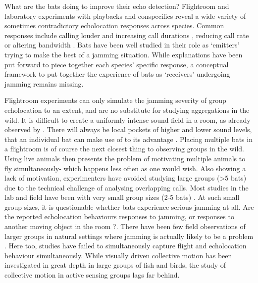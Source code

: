 \documentclass[
]{book}
\begin{document}
What are the bats doing to improve their echo detection? Flightroom and laboratory experiments with playbacks and conspecifics reveal a wide variety of sometimes contradictory echolocation responses across species. Common responses include calling louder and increasing call durations \citep{tressler2009a, m1989a, amichai2015a, luo2015a}, reducing call rate \citep{adams2017a} or altering bandwidth \citep{hase2016a, hase2018a, hage2013ambient}. Bats have been well studied in their role as `emitters' trying to make the best of a jamming situation. While explanations have been put forward to piece together each species' specific response, a conceptual framework to put together the experience of bats as `receivers' undergoing jamming remains missing.

Flightroom experiments can only simulate the jamming severity of group echolocation to an extent, and are no substitute for studying aggregations in the wild. It is difficult to create a uniformly intense sound field in a room, as already observed by \citet{griffinresistance}. There will always be local pockets of higher and lower sound levels, that an individual bat can make use of to its advantage . Placing multiple bats in a flightroom is of course the next closest thing to observing groups in the wild. Using live animals then presents the problem of motivating multiple animals to fly simultaneously- which happens less often as one would wish. Also showing a lack of motivation, experimenters have avoided studying large groups (\textgreater5 bats) due to the technical challenge of analysing overlapping calls. Most studies in the lab and field have been with very small group sizes (2-5 bats) \citep{jones1994individual, fawcett2015clutter, fawcett2015echolocation, goetze2016a, adams2017a, hase2018a}. At such small group sizes, it is questionable whether bats experience serious jamming at all. Are the reported echolocation behaviours responses to jamming, or responses to another moving object in the room \citep{fawcett2015clutter, fawcett2015echolocation, cvikel2015a}?. There have been few field observations of larger groups in natural settings where jamming is actually likely to be a problem \citep{gillam2010a, theriault2010a, cvikel2015a, lin2016a}. Here too, studies have failed to simultaneously capture flight and echolocation behaviour simultaneously. While visually driven collective motion has been investigated in great depth in large groups of fish and birds, the study of collective motion in active sensing groups lags far behind.
\end{document}
